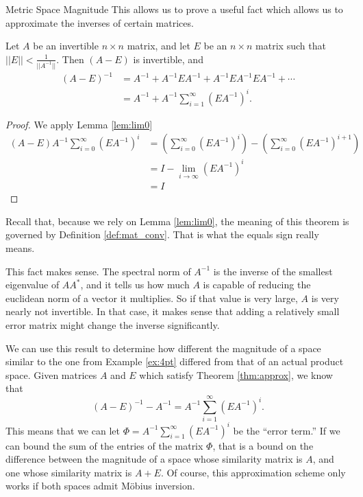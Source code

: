 \documentclass[12pt]{pom_thesis}
\begin{document}
\begin{chapter}{Metric Space Magnitude}
This allows us to prove a useful fact which allows us to approximate the inverses of certain matrices.
\begin{thm}\label{thm:approx}
Let $A$ be an invertible $n \times n$ matrix, and let $E$ be an $n \times n$ matrix such that $||E|| < \frac 1{||A^{-1}||}$. Then $(A-E)$ is invertible, and
\begin{align*}
(A - E)^{-1} &= A^{-1} + A^{-1}EA^{-1} + A^{-1}EA^{-1}EA^{-1} + \cdots\\
&= A^{-1} + A^{-1}\sum_{i = 1}^\infty (EA^{-1})^i.
\end{align*}
\end{thm}
\begin{proof}
We apply Lemma \ref{lem:lim0}
\begin{align*}
(A-E)  A^{-1}\sum_{i = 0}^\infty (EA^{-1})^i
&= \left(\sum_{i = 0}^\infty (EA^{-1})^i\right) - \left( \sum_{i = 0}^\infty (EA^{-1})^{i+1}\right)\\
&= I - \lim_{i \rightarrow \infty} (EA^{-1})^i\\
&= I
\end{align*}
\end{proof}
\begin{rmk}
Recall that, because we rely on Lemma \ref{lem:lim0}, the meaning of this theorem is governed by Definition \ref{def:mat_conv}. That is what the equals sign really means. 
\end{rmk}
This fact makes sense. The spectral norm of $A^{-1}$ is the inverse of the smallest eigenvalue of $AA^*$, and it tells us how much $A$ is capable of reducing the euclidean norm of a vector it multiplies. So if that value is very large, $A$ is very nearly not invertible. In that case, it makes sense that adding a relatively small error matrix might change the inverse significantly. 

We can use this result to determine how different the magnitude of a space similar to the one from Example \ref{ex:4pt} differed from that of an actual product space. Given matrices $A$ and $E$ which satisfy Theorem \ref{thm:approx}, we know that 
\[
(A - E)^{-1} - A^{-1} = A^{-1}\sum_{i = 1}^\infty (EA^{-1})^i.
\]
This means that we can let $\Phi = A^{-1}\sum_{i = 1}^\infty (EA^{-1})^i$ be the ``error term.'' If we can bound the sum of the entries of the matrix $\Phi$, that is a bound on the difference between the magnitude of a space whose similarity matrix is $A$, and one whose similarity matrix is $A + E$. Of course, this approximation scheme only works if both spaces admit M\"obius inversion.



\end{chapter}
\end{document}
